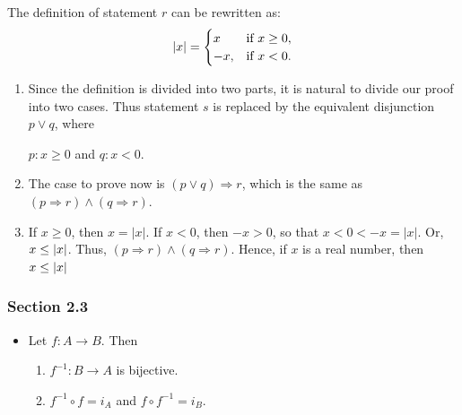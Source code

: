 \documentclass[12pt]{article}
\begin{document}
\begin{itemize}
The definition of statement \(r\) can be rewritten as:
\[\lvert{}x\rvert{}= 
  \begin{cases} 
    x & $if $x\ge{}0,  \\
    -x, & $if $x<0.
  \end{cases} \]

\begin{enumerate}
\item Since the definition is divided into two parts, it is natural to divide our
proof into two cases. Thus statement \(s\) is replaced by the equivalent
disjunction \(p\lor{}q\), where
\begin{center}
\(p: x\ge0\) and \(q: x<0\).
\end{center}

\item The case to prove now is \((p\lor{}q)\Rightarrow{}r\), which is the same as \((p\Rightarrow{}r)\land(q\Rightarrow{}r)\).

\item If \(x\ge0\), then \(x=\lvert{}x\rvert{}\). If \(x<0\), then \(-x>0\), so that
\(x<0<-x=\lvert{}x\rvert{}\). Or, \(x\le\left|x\right|\). Thus, \((p\Rightarrow{}r)\land(q\Rightarrow{}r)\). Hence, if
\(x\) is a real number, then \(x\le\left|x\right|\)
\end{enumerate}
\end{itemize}
\subsubsection{Section 2.3}
\label{sec:org738adf8}
\begin{itemize}
\item Let \(f:A\longrightarrow{}B\). Then
\begin{enumerate}
\item \(f^{-1}:B\longrightarrow{}A\) is bijective.
\item \(f^{-1}\circ{}f=i_{A}\) and \(f\circ{}f^{-1}=i_{B}\).
\end{enumerate}
\end{itemize}
\end{document}
